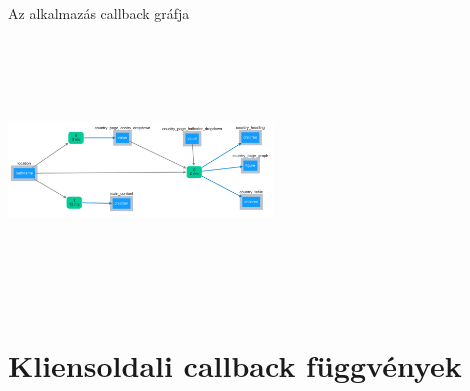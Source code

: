\documentclass[english, aspectratio=169]{beamer}
\makeatletter
\let\origtableofcontents=\tableofcontents
\def\tableofcontents{\@ifnextchar[{\origtableofcontents}{\gobbletableofcontents}}
\def\gobbletableofcontents#1{\origtableofcontents}
\makeatother
\begin{document}
	\begin{frame}[fragile]{Az alkalmazás callback gráfja}
		\begin{center}
			\includegraphics[width=7cm, height=7cm, keepaspectratio]{images/adv_8.png}
		\end{center}
	\end{frame}
	
	\section{Kliensoldali callback függvények}
	
	\begin{frame}{}
		\tableofcontents[currentsection]
	\end{frame}
	
\end{document}
